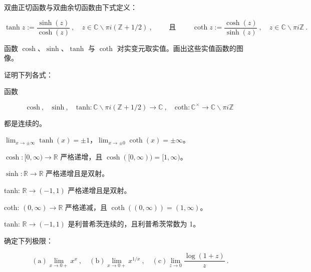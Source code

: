 \begin{exercises}
双曲正切函数与双曲余切函数由下式定义：

\[
\operatorname{t a n h}z:=\frac{\sinh(z)}{\cosh(z)}\:,\quad z\in\mathbb{C}\backslash\pi i\left(\mathbb{Z}+1/2\right)\:,\qquad\text{ 且 }\qquad\coth z:=\frac{\cosh(z)}{\sinh(z)}\:,\quad z\in\mathbb{C}\backslash\pi i\mathbb{Z}\:.
\]

函数 $ \cosh $、$ \sinh $、$ \tanh $ 与 $ \coth $ 对实变元取实值。画出这些实值函数的图像。

证明下列各式：

\begin{items}
\item

函数

\[
\mathrm{c o s h}~,\quad\mathrm{s i n h}~,\quad\mathrm{t a n h}:\mathbb{C}\backslash\pi i(\mathbb{Z}+1/2)\to\mathbb{C}~,\quad\mathrm{c o t h}:\mathbb{C}^{\times}\to\mathbb{C}\backslash\pi i\mathbb{Z}
\]

都是连续的。

\item

$ \lim_{x \to \pm \infty} \tanh(x) = \pm 1 $，$ \lim_{x \to \pm 0} \coth(x) = \pm \infty $。

\item

$ \cosh: [0,\infty) \to \mathbb{R} $ 严格递增，且 $ \cosh([0,\infty)) = [1,\infty) $。

\item

$ \sinh: \mathbb{R} \to \mathbb{R} $ 严格递增且是双射。

\item

tanh:  $ \mathbb{R} \to (-1,1) $ 严格递增且是双射。

\item

coth:  $ (0, \infty) \to \mathbb{R} $ 严格递减，且 $ \coth((0, \infty)) = (1, \infty) $。

\item

tanh:  $ \mathbb{R} \to (-1,1) $ 是利普希茨连续的，且利普希茨常数为 1。

\end{items}

\item

确定下列极限：

\[
\mathrm{(a)}\operatorname*{l i m}_{x\to{0+}}x^{x}~,\quad\mathrm{(b)}\operatorname*{l i m}_{x\to{0+}}x^{1/x}~,\quad\mathrm{(c)}\operatorname*{l i m}_{z\to{0}}\frac{\operatorname{l o g}(1+z)}{z}~.
\]


\end{exercises}
